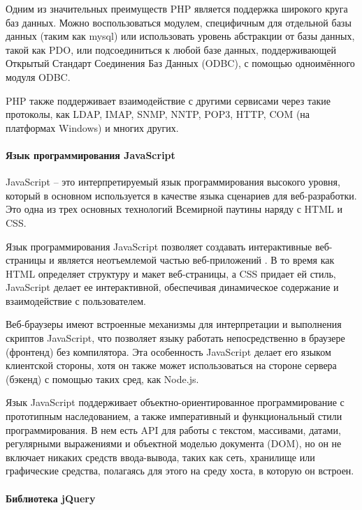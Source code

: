 Одним из значительных преимуществ PHP является поддержка широкого круга баз данных. Можно воспользоваться модулем, специфичным для отдельной базы данных (таким как mysql) или использовать уровень абстракции от базы данных, такой как PDO, или подсоединиться к любой базе данных, поддерживающей Открытый Стандарт Соединения Баз Данных (ODBC), с помощью одноимённого модуля ODBC.

PHP также поддерживает взаимодействие с другими сервисами через такие протоколы, как LDAP, IMAP, SNMP, NNTP, POP3, HTTP, COM (на платформах Windows) и многих других.

\paragraph{Язык программирования JavaScript}

JavaScript -- это интерпретируемый язык программирования высокого уровня, который в основном используется в качестве языка сценариев для веб-разработки. Это одна из трех основных технологий Всемирной паутины наряду с HTML и CSS.

Язык программирования JavaScript позволяет создавать интерактивные веб-страницы и является неотъемлемой частью веб-приложений \cite{javascript}. В то время как HTML определяет структуру и макет веб-страницы, а CSS придает ей стиль, JavaScript делает ее интерактивной, обеспечивая динамическое содержание и взаимодействие с пользователем.

Веб-браузеры имеют встроенные механизмы для интерпретации и выполнения скриптов JavaScript, что позволяет языку работать непосредственно в браузере (фронтенд) без компилятора. Эта особенность JavaScript делает его языком клиентской стороны, хотя он также может использоваться на стороне сервера (бэкенд) с помощью таких сред, как Node.js.

Язык JavaScript поддерживает объектно-ориентированное программирование с прототипным наследованием, а также императивный и функциональный стили программирования. В нем есть API для работы с текстом, массивами, датами, регулярными выражениями и объектной моделью документа (DOM), но он не включает никаких средств ввода-вывода, таких как сеть, хранилище или графические средства, полагаясь для этого на среду хоста, в которую он встроен.

\paragraph{Библиотека jQuery}

